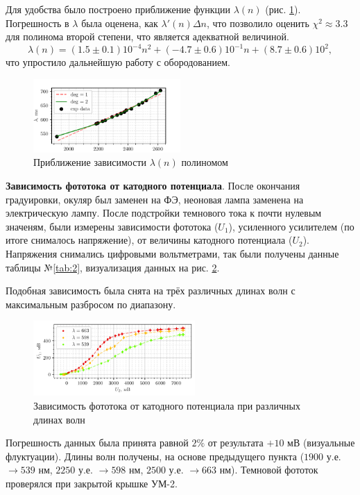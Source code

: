 Для удобства было построено приближение функции $\lambda(n)$ (рис. \ref{fig:1}). Погрешность в $\lambda$ была оценена, как $\lambda'(n) \Delta n$, что позволило оценить $\chi^2 \approx 3.3$ для полинома второй степени, что является адекватной величиной.
\begin{equation*}
    \lambda(n) = (1.5 \pm 0.1) 10^{-4} n^2 + (-4.7 \pm 0.6) 10^{-1} n + (8.7 \pm 0.6) 10^2,
\end{equation*}
что упростило дальнейшую работу с обородованием.

\vspace{-5mm}

\begin{figure}[ht]
    \centering
    \includegraphics[width=0.5\textwidth]{figs/fig1.pdf}
    \vspace{-4mm}
    \caption{Приближение зависимости $\lambda(n)$ полиномом}
    \label{fig:1}
\end{figure}


\textbf{Зависимость фототока от катодного потенциала}. После окончания градуировки, окуляр был заменен на ФЭ, неоновая лампа заменена на электрическую лампу. После подстройки темнового тока к почти нулевым значеням, были измерены зависимости фототока ($U_1$), усиленного усилителем (по итоге снималось напряжение), от величины катодного потенциала ($U_2$). Напряжения снимались цифровыми вольтметрами, так были получены данные таблицы №\ref{tab:2}, визуализация данных на рис. \ref{fig:UU}. 

Подобная зависимость была снята на трёх различных длинах волн с максимальным разбросом по диапазону.


\begin{figure}[ht]
    \centering
    \includegraphics[width=0.55\textwidth]{figs/fig2.pdf}
    \vspace{-5mm}
    \caption{Зависимость фототока от катодного потенциала при различных длинах волн}
    \label{fig:UU}
\end{figure}




Погрешность данных была принята равной $2 \%$ от результата $+ 10$ мВ (визуальные флуктуации). Длины волн получены, на основе предыдущего пункта ($1900$ у.е. $\to 539$ нм,
$2250$ у.е. $\to 598$ нм,
$2500$ у.е. $\to 663$ нм). Темновой фототок проверялся при закрытой крышке УМ-2.